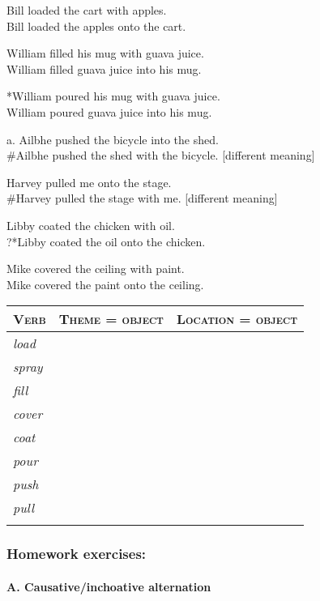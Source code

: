 \ea
\label{ex:key:2}
\ea%
Bill loaded the cart with apples.\\
\ex Bill loaded the apples onto the cart.
    \z
\z

\ea
\label{ex:key:3}
\ea%
William filled his mug with guava juice.\\
\ex *William filled guava juice into his mug.
    \z
\z

\ea
    \label{ex:key:4}
\ea%
 *William poured his mug with guava juice.\\
\ex  William poured guava juice into his mug.
    \z
\z

\ea
\ea%
    \label{ex:key:5}




          a. Ailbhe pushed the bicycle into the shed.\\
\ex \#Ailbhe pushed the shed with the bicycle.  [different meaning]
    \z
\z

\ea
    \label{ex:key:6}
\ea%
 Harvey pulled me onto the stage.\\
\ex \#Harvey pulled the stage with me.   [different meaning]
    \z
\z

\ea
    \label{ex:key:7}
\ea%
 Libby coated the chicken with oil.\\
\ex ?*Libby coated the oil onto the chicken.
    \z
\z

\ea
    \label{ex:key:8}
\ea%
Mike covered the ceiling with paint.\\
\ex * Mike covered the paint onto the ceiling.
    \z
\z

\begin{tabularx}{\textwidth}{XXX}
\lsptoprule
\bfseries\scshape Verb & \bfseries\scshape Theme = object & \bfseries\scshape Location = object\\\midrule
\itshape load &  & \\
\itshape spray &  & \\
\itshape fill &  & \\
\itshape cover &  & \\
\itshape coat &  & \\
\itshape pour &  & \\
\itshape push &  & \\
\itshape pull &  & \\
\lspbottomrule
\end{tabularx}
\subsubsection{Homework exercises:}\label{sec:}
\paragraph{A. Causative/inchoative alternation}\footnotemark{}

